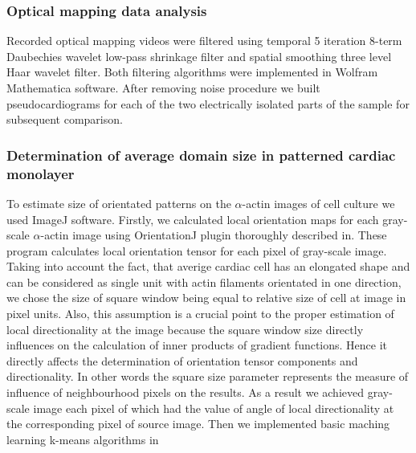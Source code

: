 \subsubsection{Optical mapping data analysis}
Recorded optical mapping videos were filtered using temporal 5 iteration 8-term Daubechies wavelet low-pass shrinkage filter and spatial smoothing three level Haar wavelet filter. Both filtering algorithms were implemented in Wolfram Mathematica software. After removing noise procedure we built pseudocardiograms for each of the two electrically isolated parts of the sample for subsequent comparison. 
\subsubsection{Determination of average domain size in patterned cardiac monolayer}  
To estimate size of orientated patterns on the $\alpha$-actin images of cell culture we used ImageJ software. Firstly, we calculated local orientation maps for each gray-scale $\alpha$-actin image using OrientationJ plugin thoroughly described in\cite{Bouten2011}. These program calculates local orientation tensor for each pixel of gray-scale image. Taking into account the fact, that averige cardiac cell has an elongated shape and can be considered as single unit with actin filaments orientated in one direction, we chose the size of square window being equal to relative size of cell at image in pixel units. Also, this assumption is a crucial point to the proper estimation of local directionality at the image because the square window size directly influences on the calculation of inner products of gradient functions. Hence it directly affects the determination of orientation tensor components and directionality. In other words the square size parameter represents the measure of influence of neighbourhood pixels on the results.    As a result we achieved gray-scale image each pixel of which had the value of angle of local directionality at the corresponding pixel of source image.       
Then we implemented basic maching learning k-means algorithms in 

